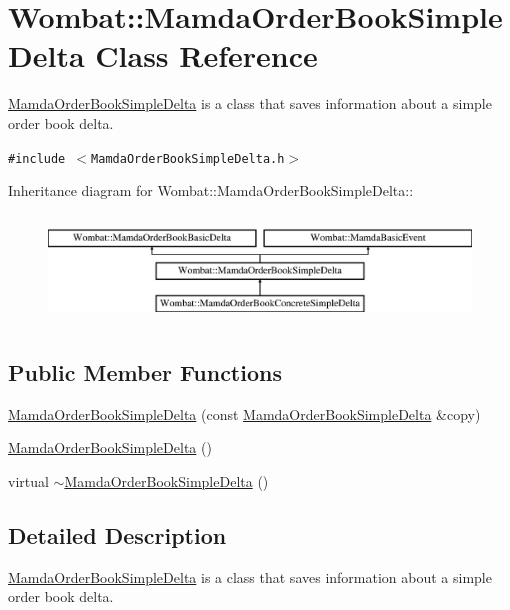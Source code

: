 \hypertarget{classWombat_1_1MamdaOrderBookSimpleDelta}{
\section{Wombat::Mamda\-Order\-Book\-Simple\-Delta Class Reference}
\label{classWombat_1_1MamdaOrderBookSimpleDelta}
}
\hyperlink{classWombat_1_1MamdaOrderBookSimpleDelta}{Mamda\-Order\-Book\-Simple\-Delta} is a class that saves information about a simple order book delta.  


{\tt \#include $<$Mamda\-Order\-Book\-Simple\-Delta.h$>$}

Inheritance diagram for Wombat::Mamda\-Order\-Book\-Simple\-Delta::\begin{figure}[H]
\begin{center}
\leavevmode
\includegraphics[height=2.8866cm]{classWombat_1_1MamdaOrderBookSimpleDelta}
\end{center}
\end{figure}
\subsection*{Public Member Functions}
\begin{CompactItemize}
\item 
\hyperlink{classWombat_1_1MamdaOrderBookSimpleDelta_e7f8d3c6b0556bc6b735e3d365bdb58a}{Mamda\-Order\-Book\-Simple\-Delta} (const \hyperlink{classWombat_1_1MamdaOrderBookSimpleDelta}{Mamda\-Order\-Book\-Simple\-Delta} \&copy)
\item 
\hyperlink{classWombat_1_1MamdaOrderBookSimpleDelta_2ca9475d473cb990f89ca4622d9bfdb2}{Mamda\-Order\-Book\-Simple\-Delta} ()
\item 
virtual \hyperlink{classWombat_1_1MamdaOrderBookSimpleDelta_8116bb05f71ee09a5b3dbaab0165c12d}{$\sim$Mamda\-Order\-Book\-Simple\-Delta} ()
\end{CompactItemize}


\subsection{Detailed Description}
\hyperlink{classWombat_1_1MamdaOrderBookSimpleDelta}{Mamda\-Order\-Book\-Simple\-Delta} is a class that saves information about a simple order book delta. 

